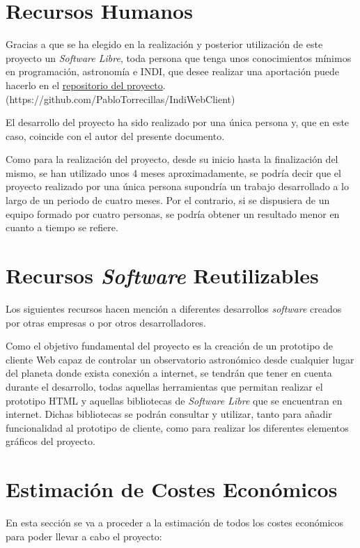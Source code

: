\section{Recursos Humanos}
Gracias a que se ha elegido en la realización y posterior utilización de este proyecto un \textit{Software Libre}, toda persona que tenga unos conocimientos mínimos en programación, astronomía e INDI, que desee realizar una aportación puede hacerlo en el \href{https://github.com/PabloTorrecillas/IndiWebClient}{repositorio del proyecto}.\\
(https://github.com/PabloTorrecillas/IndiWebClient)

El desarrollo del proyecto ha sido realizado por una única persona y, que en este caso, coincide con el autor del presente documento.

Como para la realización del proyecto, desde su inicio hasta la finalización del mismo, se han utilizado unos 4 meses aproximadamente, se podría decir que el proyecto realizado por una única persona supondría un trabajo desarrollado a lo largo de un periodo de cuatro meses. Por el contrario, si se dispusiera de un equipo formado por cuatro personas, se podría obtener un resultado menor en cuanto a tiempo se refiere.
\section{Recursos \textit{Software} Reutilizables}
Los siguientes recursos hacen mención a diferentes desarrollos \textit{software} creados por otras empresas o por otros desarrolladores.

Como el objetivo fundamental del proyecto es la creación de un prototipo de cliente Web capaz de controlar un observatorio astronómico desde cualquier lugar del planeta donde exista conexión a internet, se tendrán que tener en cuenta durante el desarrollo, todas aquellas herramientas que permitan realizar el prototipo HTML y aquellas bibliotecas de \textit{Software Libre} que se encuentran en internet. Dichas bibliotecas se podrán consultar y utilizar, tanto para añadir funcionalidad al prototipo de cliente, como para realizar los diferentes elementos gráficos del proyecto.

\section{Estimación de Costes Económicos}
En esta sección se va a proceder a la estimación de todos los costes económicos para poder llevar a cabo el proyecto:

